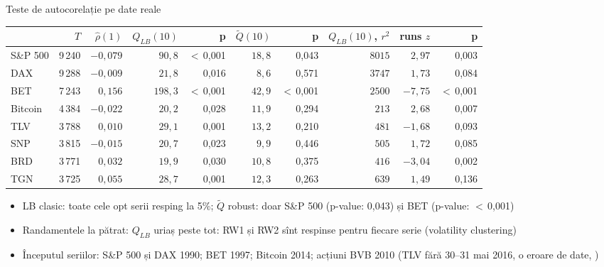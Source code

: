 \begin{frame}{Teste de autocorelație pe date reale}
\itemsize{\footnotesize}
\begin{center}
\scriptsize
\begin{tabular}{lrrrrrrrrr}
\toprule
& $T$ & $\hat\rho(1)$ & $Q_{LB}(10)$ & p & $\tilde Q(10)$ & p & $Q_{LB}(10)$, $r^2$ & runs $z$ & p \\
\midrule
S\&P 500 & 9\,240 & ${-0{,}079}$ & $90{,}8$ & $<$\,0{,}001 & $18{,}8$ & 0{,}043 & $8015$ & ${2{,}97}$ & 0{,}003 \\
DAX & 9\,288 & ${-0{,}009}$ & $21{,}8$ & 0{,}016 & $8{,}6$ & 0{,}571 & $3747$ & ${1{,}73}$ & 0{,}084 \\
BET & 7\,243 & ${0{,}156}$ & $198{,}3$ & $<$\,0{,}001 & $42{,}9$ & $<$\,0{,}001 & $2500$ & ${-7{,}75}$ & $<$\,0{,}001 \\
Bitcoin & 4\,384 & ${-0{,}022}$ & $20{,}2$ & 0{,}028 & $11{,}9$ & 0{,}294 & $213$ & ${2{,}68}$ & 0{,}007 \\
TLV & 3\,788 & ${0{,}010}$ & $29{,}1$ & 0{,}001 & $13{,}2$ & 0{,}210 & $481$ & ${-1{,}68}$ & 0{,}093 \\
SNP & 3\,815 & ${-0{,}015}$ & $20{,}7$ & 0{,}023 & $9{,}9$ & 0{,}446 & $505$ & ${1{,}72}$ & 0{,}085 \\
BRD & 3\,771 & ${0{,}032}$ & $19{,}9$ & 0{,}030 & $10{,}8$ & 0{,}375 & $416$ & ${-3{,}04}$ & 0{,}002 \\
TGN & 3\,725 & ${0{,}055}$ & $28{,}7$ & 0{,}001 & $12{,}3$ & 0{,}263 & $639$ & ${1{,}49}$ & 0{,}136 \\
\bottomrule
\end{tabular}
\end{center}
\begin{itemize}
    \item LB clasic: toate cele opt serii resping la 5\%; $\tilde Q$ robust: doar S\&P 500 (p-value: 0{,}043) și BET (p-value: $<$\,0{,}001)
    \item Randamentele la pătrat: $Q_{LB}$ uriaș peste tot: RW1 și RW2 sînt respinse pentru fiecare serie (volatility clustering)
    \item Începutul seriilor: S\&P 500 și DAX 1990; BET 1997; Bitcoin 2014; acțiuni BVB 2010 (TLV fără 30--31 mai 2016, o eroare de date, )
\end{itemize}
\end{frame}

